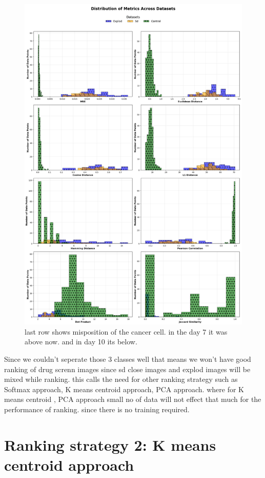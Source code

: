 \begin{figure}[H]
  \centering
  \includegraphics[scale=0.7]{figures/bargraph.pdf} 
  \caption{last row shows misposition of the cancer cell. in the day 7 it was above now. and in day 10 its below.}
  \label{fig:bargraph}
\end{figure}

Since we couldn't seperate those 3 classes well that means we won't have good ranking of drug screnn images since sd close images and explod images will be mixed while ranking. this calls the need for other ranking strategy such as Softmax approach, K means centroid approach, PCA approach. where for K means centroid , PCA approach small no of data will not effect that much for the performance of ranking. since there is no training required.

\section{Ranking strategy 2: K means centroid approach}

